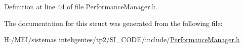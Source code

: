 Definition at line 44 of file Performance\+Manager.\+h.



The documentation for this struct was generated from the following file\+:\begin{DoxyCompactItemize}
\item 
H\+:/\+M\+E\+I/sistemas inteligentes/tp2/\+S\+I\+\_\+\+C\+O\+D\+E/include/\hyperlink{_performance_manager_8h}{Performance\+Manager.\+h}\end{DoxyCompactItemize}
